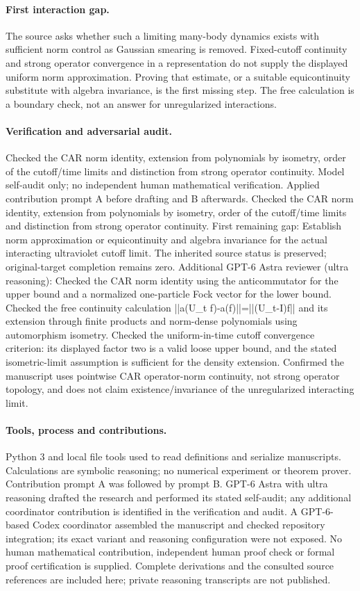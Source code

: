 \documentclass[11pt]{article}
\begin{document}
\paragraph{First interaction gap.} The source asks whether such a limiting many-body dynamics exists with sufficient norm control as Gaussian smearing is removed. Fixed-cutoff continuity and strong operator convergence in a representation do not supply the displayed uniform norm approximation. Proving that estimate, or a suitable equicontinuity substitute with algebra invariance, is the first missing step. The free calculation is a boundary check, not an answer for unregularized interactions.

\paragraph{Verification and adversarial audit.}
Checked the CAR norm identity, extension from polynomials by isometry, order of the cutoff/time limits and distinction from strong operator continuity. Model self-audit only; no independent human mathematical verification. Applied contribution prompt A before drafting and B afterwards. Checked the CAR norm identity, extension from polynomials by isometry, order of the cutoff/time limits and distinction from strong operator continuity. First remaining gap: Establish norm approximation or equicontinuity and algebra invariance for the actual interacting ultraviolet cutoff limit. The inherited source status is preserved; original-target completion remains zero. Additional GPT-6 Astra reviewer (ultra reasoning): Checked the CAR norm identity using the anticommutator for the upper bound and a normalized one-particle Fock vector for the lower bound. Checked the free continuity calculation ||a(U\_t f)-a(f)||=||(U\_t-I)f|| and its extension through finite products and norm-dense polynomials using automorphism isometry. Checked the uniform-in-time cutoff convergence criterion: its displayed factor two is a valid loose upper bound, and the stated isometric-limit assumption is sufficient for the density extension. Confirmed the manuscript uses pointwise CAR operator-norm continuity, not strong operator topology, and does not claim existence/invariance of the unregularized interacting limit.

\paragraph{Tools, process and contributions.}
Python 3 and local file tools used to read definitions and serialize manuscripts. Calculations are symbolic reasoning; no numerical experiment or theorem prover. Contribution prompt A was followed by prompt B. GPT-6 Astra with ultra reasoning drafted the research and performed its stated self-audit; any additional coordinator contribution is identified in the verification and audit. A GPT-6-based Codex coordinator assembled the manuscript and checked repository integration; its exact variant and reasoning configuration were not exposed. No human mathematical contribution, independent human proof check or formal proof certification is supplied. Complete derivations and the consulted source references are included here; private reasoning transcripts are not published.
\end{document}
